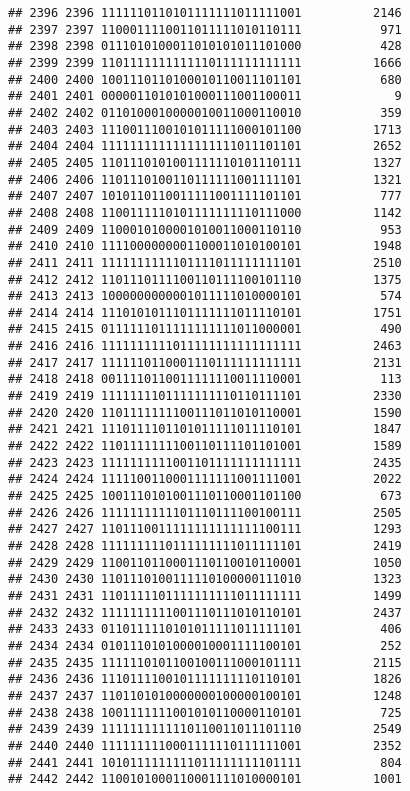 \documentclass[]{article}
\begin{document}
\begin{verbatim}
## 2396 2396 1111110110101111111011111001          2146
## 2397 2397 1100011110011011111010110111           971
## 2398 2398 0111010100011010101011101000           428
## 2399 2399 1101111111111110111111111111          1666
## 2400 2400 1001110110100010110011101101           680
## 2401 2401 0000011010101000111001100011             9
## 2402 2402 0110100010000010011000110010           359
## 2403 2403 1110011100101011111000101100          1713
## 2404 2404 1111111111111111111011101101          2652
## 2405 2405 1101110101001111110101110111          1327
## 2406 2406 1101110100110111111001111101          1321
## 2407 2407 1010110110011111001111101101           777
## 2408 2408 1100111110101111111110111000          1142
## 2409 2409 1100010100001010011000110110           953
## 2410 2410 1111000000001100011010100101          1948
## 2411 2411 1111111111101111011111111101          2510
## 2412 2412 1101110111100110111100101110          1375
## 2413 2413 1000000000001011111010000101           574
## 2414 2414 1110101011101111111011110101          1751
## 2415 2415 0111111011111111111011000001           490
## 2416 2416 1111111111011111111111111111          2463
## 2417 2417 1111110110001110111111111111          2131
## 2418 2418 0011110110011111110011110001           113
## 2419 2419 1111111101111111110110111101          2330
## 2420 2420 1101111111100111011010110001          1590
## 2421 2421 1110111101101011111011110101          1847
## 2422 2422 1101111111100110111101101001          1589
## 2423 2423 1111111111001101111111111111          2435
## 2424 2424 1111100110001111111001111001          2022
## 2425 2425 1001110101001110110001101100           673
## 2426 2426 1111111111101110111100100111          2505
## 2427 2427 1101110011111111111111100111          1293
## 2428 2428 1111111110111111111011111101          2419
## 2429 2429 1100110110001110110010110001          1050
## 2430 2430 1101110100111110100000111010          1323
## 2431 2431 1101111101111111111011111111          1499
## 2432 2432 1111111111001110111010110101          2437
## 2433 2433 0110111110101011111011111101           406
## 2434 2434 0101110101000010001111100101           252
## 2435 2435 1111110101100100111000101111          2115
## 2436 2436 1110111100101111111110110101          1826
## 2437 2437 1101101010000000100000100101          1248
## 2438 2438 1001111111001010110000110101           725
## 2439 2439 1111111111110110011011101110          2549
## 2440 2440 1111111110001111110111111001          2352
## 2441 2441 1010111111111011111111101111           804
## 2442 2442 1100101000110001111010000101          1001

\end{verbatim}
\end{document}
